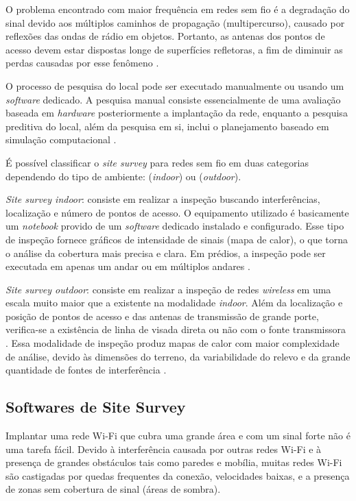 O problema encontrado com maior frequência em redes sem fio é a degradação do sinal devido aos múltiplos caminhos de propagação (multipercurso), causado por reflexões das ondas de rádio em objetos. Portanto, as antenas dos pontos de acesso devem estar dispostas longe de superfícies refletoras, a fim de diminuir as perdas causadas por esse fenômeno \cite{kar2018ieee}.

O processo de pesquisa do local pode ser executado manualmente ou usando um \textit{software} dedicado. A pesquisa manual consiste essencialmente de uma avaliação baseada em \textit{hardware} posteriormente a implantação da rede, enquanto a pesquisa preditiva do local, além da pesquisa em si, inclui o planejamento baseado em simulação computacional \cite{kar2018ieee}.

É possível classificar o \textit{site survey} para redes sem fio em duas categorias dependendo do tipo de ambiente: (\textit{indoor}) ou (\textit{outdoor}).

\textit{Site survey indoor}: consiste em realizar a inspeção buscando interferências, localização e número de pontos de acesso. O equipamento utilizado é basicamente um \textit{notebook} provido de um \textit{software} dedicado instalado e configurado. Esse tipo de inspeção fornece gráficos de intensidade de sinais (mapa de calor), o que torna o análise da cobertura mais precisa e clara. Em prédios, a inspeção pode ser executada em apenas um andar ou em múltiplos andares .

\textit{Site survey outdoor}: consiste em realizar a inspeção de redes \textit{wireless} em uma escala muito maior que a existente na modalidade \textit{indoor}. Além da localização e posição de pontos de acesso e das antenas de transmissão de grande porte, verifica-se a existência de linha de visada direta ou não com o fonte transmissora \cite{pinheiro2004site}. Essa modalidade de inspeção produz mapas de calor com maior complexidade de análise, devido às dimensões do terreno, da variabilidade do relevo e da grande quantidade de fontes de interferência .

\subsection{Softwares de Site Survey}
\label{subsec:softwares-site-survey}

Implantar uma rede Wi-Fi que cubra uma grande área e com um sinal forte não é uma tarefa fácil. Devido à interferência causada por outras redes Wi-Fi e à presença de grandes obstáculos tais como paredes e mobília, muitas redes Wi-Fi são castigadas por quedas frequentes da conexão, velocidades baixas, e a presença de zonas sem cobertura de sinal (áreas de sombra).

